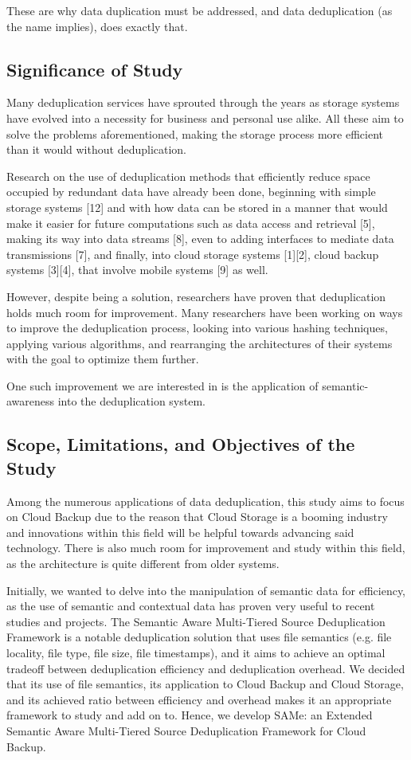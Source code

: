 \documentclass[journal]{IEEEtran}
\begin{document}
These are why data duplication must be addressed, and data deduplication (as the name implies), does exactly that. 

\subsection{Significance of Study}

Many deduplication services have sprouted through the years as storage systems have evolved into a necessity for business and personal use alike. All these aim to solve the problems aforementioned, making the storage process more efficient than it would without deduplication.

Research on the use of deduplication methods that efficiently reduce space occupied by redundant data have already been done, beginning with simple storage systems [12] and with how data can be stored in a manner that would make it easier for future computations such as data access and retrieval [5], making its way into data streams [8], even to adding interfaces to mediate data transmissions [7], and finally, into cloud storage systems [1][2], cloud backup systems [3][4], that involve mobile systems [9] as well.

However, despite being a solution, researchers have proven that deduplication holds much room for improvement. Many researchers have been working on ways to improve the deduplication process, looking into various hashing techniques, applying various algorithms, and rearranging the architectures of their systems with the goal to optimize them further.

One such improvement we are interested in is the application of semantic-awareness into the deduplication system.

\subsection{Scope, Limitations, and Objectives of the Study}

Among the numerous applications of data deduplication, this study aims to focus on Cloud Backup due to the reason that Cloud Storage is a booming industry and innovations within this field will be helpful towards advancing said technology. There is also much room for improvement and study within this field, as the architecture is quite different from older systems.

Initially, we wanted to delve into the manipulation of semantic data for efficiency, as the use of semantic and contextual data has proven very useful to recent studies and projects. The Semantic Aware Multi-Tiered Source Deduplication Framework is a notable deduplication solution that uses file semantics (e.g. file locality, file type, file size, file timestamps), and it aims to achieve an optimal tradeoff between deduplication efficiency and deduplication overhead. We decided that its use of file semantics, its application to Cloud Backup and Cloud Storage, and its achieved ratio between efficiency and overhead makes it an appropriate framework to study and add on to. Hence, we develop SAMe: an Extended Semantic Aware Multi-Tiered Source Deduplication Framework for Cloud Backup.
\end{document}

